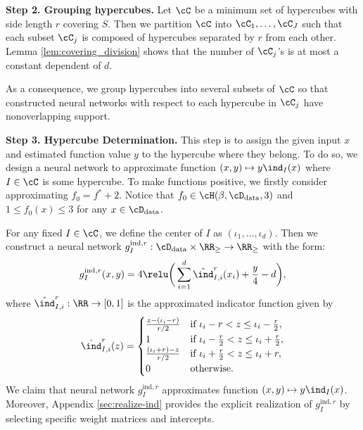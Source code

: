 \textbf{Step 2. Grouping hypercubes.} Let $\cC$ be a minimum set of hypercubes with side length $r$ covering $S$. Then we partition $\cC$ into $\cC_1,\ldots,\cC_J$ such that each subset $\cC_j$ is composed of hypercubes separated by $r$ from each other. Lemma \ref{lem:covering_division} shows that the number of $\cC_j$'s is at most a constant dependent of $d$.

As a consequence, we group hypercubes into several subsets of $\cC$ so that  constructed neural networks with respect to each hypercube in $\cC_j$ have nonoverlapping support. 


\textbf{Step 3. Hypercube Determination.} 
This step is to assign the given input $x$ and estimated function value $y$ to the hypercube where they belong. To do so, we design a neural network to approximate function $(x,y) \mapsto y\ind_I(x)$ where $I \in \cC$ is some hypercube. To make functions positive, we firstly consider approximating $f_0 = f^* + 2$. Notice that $f_0 \in \cH(\beta,\cD_{\rm data}, 3)$ and $1 \leq f_0(x) \leq 3 $ for any $x \in \cD_{\rm data}$. 

For any fixed $I \in \cC$, we define the center of $I$ as $(\iota_1, \dots, \iota_d)$.
Then we construct a neural network $g_I^{\text{ind},r}: \cD_{\rm data} \times \RR_\geq \to \RR_\geq$ with the form:
\begin{align}
    g_I^{\text{ind},r} (x,y) =  4 \relu \bigg(\sum_{i=1}^d \hat{\ind}_{I, i}^r(x_i) + \frac{y}4 - d \bigg),\label{eq:identical}
\end{align}
where $\hat{\ind}^r_{I, i}: \RR \to [0, 1]$ is the approximated indicator function given by
\begin{equation*}
  \hat{\ind}^r_{I, i}(z) = \begin{cases}
  \frac{z - (\iota_i - r)}{r/2} & \text{if } \iota_i - r < z \leq \iota_i - \frac{r}{2},\\
  1 & \text{if } \iota_i - \frac{r}{2} < z \leq \iota_i + \frac{r}{2},\\
  \frac{(\iota_i + r) - z}{r/2} & \text{if } \iota_i + \frac{r}{2} < z \leq \iota_i + r,\\
  0 & \text{otherwise. } %
\end{cases}
\end{equation*}
We claim that neural network $g_I^{\text{ind},r}$ approximates function $(x,y) \mapsto y\ind_I(x)$. Moreover, Appendix \ref{sec:realize-ind} provides the explicit realization of $g_I^{\text{ind},r}$ by selecting specific weight matrices and intercepts.

